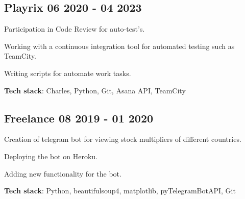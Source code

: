 \documentclass[a4paper,12pt]{article}
\begin{document}


\subsection{{Playrix } \hfill 06 2020 - 04 2023}

\begin{zitemize}
\item Participation in Code Review for auto-test's.
\item Working with a continuous integration tool for automated testing such as TeamCity.
\item Writing scripts for automate work tasks.
\end{zitemize}

\textbf {Tech stack}: Charles, Python, Git, Asana API, TeamCity


\vspace*{8pt}

\subsection{{Freelance } \hfill 08 2019 - 01 2020}

\begin{zitemize}
\item Creation of telegram bot for viewing stock multipliers of different countries.
\item Deploying the bot on Heroku.
\item Adding new functionality for the bot.
\end{zitemize}

\textbf {Tech stack}: Python, beautifulsoup4, matplotlib, pyTelegramBotAPI, Git
\end{document}
